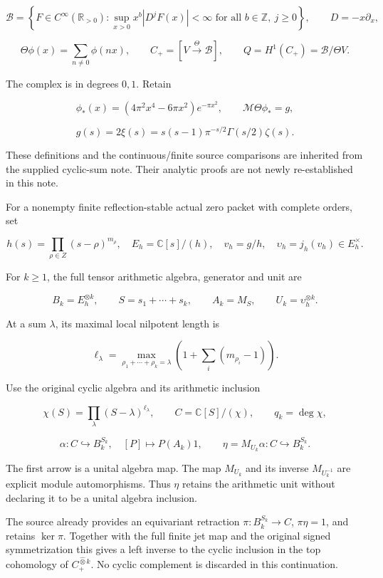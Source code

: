 \documentclass[
  11pt,
]{article}
\begin{document}
\[
\mathscr B=\left\{F\in C^\infty(\mathbb R_{>0}):
\sup_{x>0}x^b|D^jF(x)|<\infty\text{ for all }b\in\mathbb Z,\ j\geq0\right\},
\qquad D=-x\partial_x,
\]

\[
\Theta\phi(x)=\sum_{n\ne0}\phi(nx),
\qquad C_+=[V\xrightarrow{\Theta}\mathscr B],
\qquad Q=H^1(C_+)=\mathscr B/\Theta V.
\]

The complex is in degrees \(0,1\). Retain

\[
\phi_*(x)=(4\pi^2x^4-6\pi x^2)e^{-\pi x^2},
\qquad
\mathcal M\Theta\phi_*=g,
\]

\[
\boxed{
g(s)=2\xi(s)=s(s-1)\pi^{-s/2}\Gamma(s/2)\zeta(s).
}
\]

These definitions and the continuous/finite source comparisons are
inherited from the supplied cyclic-sum note. Their analytic proofs are
not newly re-established in this note.

For a nonempty finite reflection-stable actual zero packet with complete
orders, set

\[
h(s)=\prod_{\rho\in Z}(s-\rho)^{m_\rho},\quad
E_h=\mathbb C[s]/(h),\quad
v_h=g/h,\quad \upsilon_h=j_h(v_h)\in E_h^\times.
\]

For \(k\geq1\), the full tensor arithmetic algebra, generator and unit
are

\[
B_k=E_h^{\otimes k},\qquad
S=s_1+\cdots+s_k,\qquad A_k=M_S,\qquad U_k=\upsilon_h^{\otimes k}.
\]

At a sum \(\lambda\), its maximal local nilpotent length is

\[
\ell_\lambda=
\max_{\rho_1+\cdots+\rho_k=\lambda}
\left(1+\sum_i(m_{\rho_i}-1)\right).
\]

Use the original cyclic algebra and its arithmetic inclusion

\[
\chi(S)=\prod_\lambda(S-\lambda)^{\ell_\lambda},
\qquad C=\mathbb C[S]/(\chi),\qquad q_k=\deg\chi,
\]

\[
\alpha:C\hookrightarrow B_k^{S_k},\quad[P]\mapsto P(A_k)1,
\qquad
\eta=M_{U_k}\alpha:C\hookrightarrow B_k^{S_k}.
\]

The first arrow is a unital algebra map. The map \(M_{U_k}\) and its
inverse \(M_{U_k^{-1}}\) are explicit module automorphisms. Thus
\(\eta\) retains the arithmetic unit without declaring it to be a unital
algebra inclusion.

The source already provides an equivariant retraction
\(\pi:B_k^{S_k}\to C\), \(\pi\eta=1\), and retains \(\ker\pi\). Together
with the full finite jet map and the original signed symmetrization this
gives a left inverse to the cyclic inclusion in the top cohomology of
\(C_+^{\widehat\otimes k}\). No cyclic complement is discarded in this
continuation.
\end{document}
